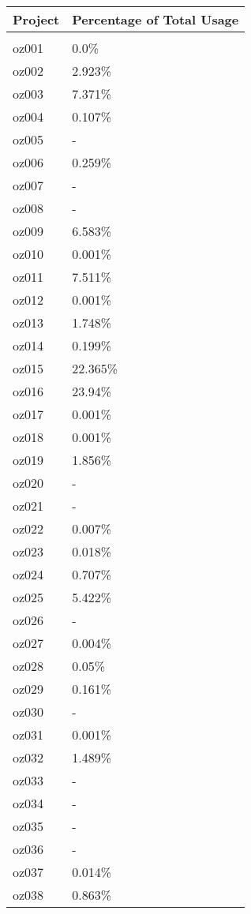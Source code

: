 \documentclass{article}%
\begin{document}
%
\begin{longtabu}{X[l] X[r]}%
\textbf{Project}&\textbf{Percentage of Total Usage}\\%
\hline%
&\\%
oz001&0.0\%\\%
\hline%
oz002&2.923\%\\%
\hline%
oz003&7.371\%\\%
\hline%
oz004&0.107\%\\%
\hline%
oz005&{-}\\%
\hline%
oz006&0.259\%\\%
\hline%
oz007&{-}\\%
\hline%
oz008&{-}\\%
\hline%
oz009&6.583\%\\%
\hline%
oz010&0.001\%\\%
\hline%
oz011&7.511\%\\%
\hline%
oz012&0.001\%\\%
\hline%
oz013&1.748\%\\%
\hline%
oz014&0.199\%\\%
\hline%
oz015&22.365\%\\%
\hline%
oz016&23.94\%\\%
\hline%
oz017&0.001\%\\%
\hline%
oz018&0.001\%\\%
\hline%
oz019&1.856\%\\%
\hline%
oz020&{-}\\%
\hline%
oz021&{-}\\%
\hline%
oz022&0.007\%\\%
\hline%
oz023&0.018\%\\%
\hline%
oz024&0.707\%\\%
\hline%
oz025&5.422\%\\%
\hline%
oz026&{-}\\%
\hline%
oz027&0.004\%\\%
\hline%
oz028&0.05\%\\%
\hline%
oz029&0.161\%\\%
\hline%
oz030&{-}\\%
\hline%
oz031&0.001\%\\%
\hline%
oz032&1.489\%\\%
\hline%
oz033&{-}\\%
\hline%
oz034&{-}\\%
\hline%
oz035&{-}\\%
\hline%
oz036&{-}\\%
\hline%
oz037&0.014\%\\%
\hline%
oz038&0.863\%\\%

\end{longtabu}
\end{document}
